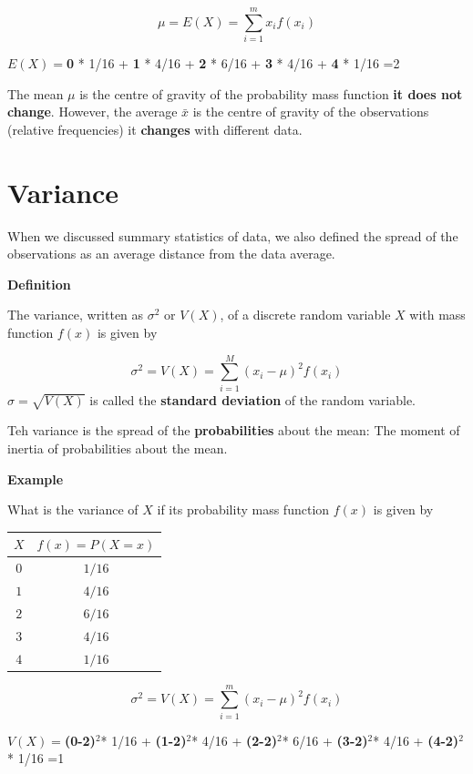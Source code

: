 \documentclass[
]{book}
\begin{document}
\[ \mu =E(X)=\sum_{i=1}^m x_i f(x_i) \]

\(E(X)=\)\textbf{0} * 1/16 + \textbf{1} * 4/16 + \textbf{2} * 6/16 + \textbf{3} * 4/16 + \textbf{4} * 1/16 =2

The mean \(\mu\) is the centre of gravity of the probability mass function \textbf{it does not change}. However, the average \(\bar{x}\) is the centre of gravity of the observations (relative frequencies) it \textbf{changes} with different data.

\hypertarget{variance}{%
\section{Variance}\label{variance}}

When we discussed summary statistics of data, we also defined the spread of the observations as an average distance from the data average.

\textbf{Definition}

The variance, written as \(\sigma^2\) or \(V(X)\), of a discrete random variable \(X\) with mass function \(f(x)\) is given by

\[\sigma^2 = V(X)= \sum_{i=1}^M (x_i-\mu)^2 f(x_i)\]
\(\sigma=\sqrt{V(X)}\) is called the \textbf{standard deviation} of the random variable.

Teh variance is the spread of the \textbf{probabilities} about the mean: The moment of inertia of probabilities about the mean.

\textbf{Example}

What is the variance of \(X\) if its probability mass function \(f(x)\) is given by

\begin{longtable}[]{@{}cc@{}}
\toprule\noalign{}
\(X\) & \(f(x)=P(X=x)\) \\
\midrule\noalign{}
\endhead
\bottomrule\noalign{}
\endlastfoot
\(0\) & \(1/16\) \\
\(1\) & \(4/16\) \\
\(2\) & \(6/16\) \\
\(3\) & \(4/16\) \\
\(4\) & \(1/16\) \\
\end{longtable}

\[\sigma^2 =V(X)=\sum_{i=1}^m (x_i-\mu)^2 f(x_i)\]

\(V(X)=\)\textbf{(0-2)}\(^2\)* 1/16 + \textbf{(1-2)}\(^2\)* 4/16 + \textbf{(2-2)}\(^2\)* 6/16 + \textbf{(3-2)}\(^2\)* 4/16 + \textbf{(4-2)}\(^2\)* 1/16 =1
\end{document}

